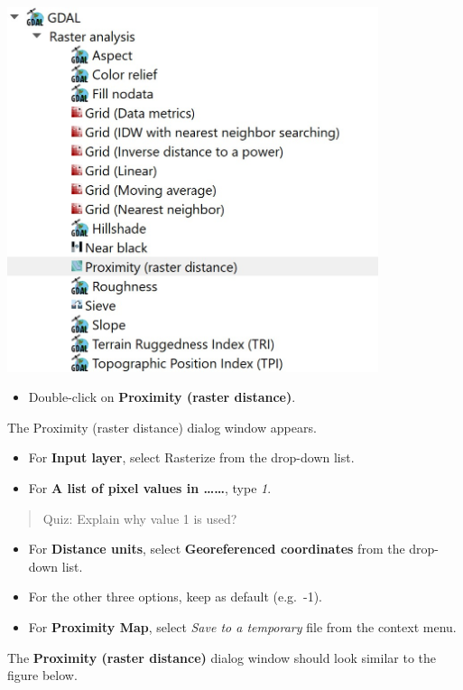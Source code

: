 \documentclass[
  letterpaper,
  DIV=11,
  numbers=noendperiod]{scrreprt}
\providecommand{\tightlist}{%
  \setlength{\itemsep}{0pt}\setlength{\parskip}{0pt}}\usepackage{longtable,booktabs,array}
\begin{document}
\includegraphics[width=4.28125in,height=\textheight]{./img06/image12.jpg}

\begin{itemize}
\tightlist
\item
  Double-click on \textbf{Proximity (raster distance)}.
\end{itemize}

The Proximity (raster distance) dialog window appears.

\begin{itemize}
\tightlist
\item
  For \textbf{Input layer}, select Rasterize from the drop-down list.
\item
  For \textbf{A list of pixel values in \ldots\ldots{}}, type \emph{1}.
\end{itemize}

\begin{quote}
Quiz: Explain why value 1 is used?
\end{quote}

\begin{itemize}
\tightlist
\item
  For \textbf{Distance units}, select \textbf{Georeferenced coordinates}
  from the drop-down list.
\item
  For the other three options, keep as default (e.g.~-1).
\item
  For \textbf{Proximity Map}, select \emph{Save to a temporary} file
  from the context menu.
\end{itemize}

The \textbf{Proximity (raster distance)} dialog window should look
similar to the figure below.
\end{document}
